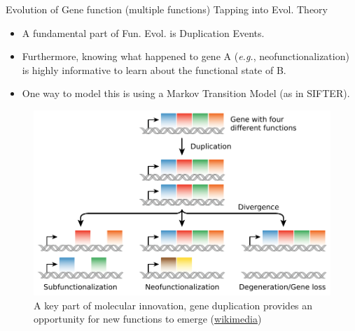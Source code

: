 \documentclass[10pt,aspectratio=169]{beamer}
\newcounter{frame}[frame]
\begin{document}
\begin{frame}{Evolution of Gene function (multiple functions)}
Tapping into Evol. Theory\\\bigskip

\begin{center}
\begin{minipage}{.44\linewidth}
\begin{itemize}[<+->]
    \item A fundamental part of Fun. Evol. is Duplication Events.
    \item Furthermore, knowing what happened to gene A (\textit{e.g.}, neofunctionalization) is highly informative to learn about the functional state of B.
    \item One way to model this is using a Markov Transition Model (as in SIFTER).
\end{itemize}
\end{minipage}
\begin{minipage}{.55\linewidth}
    \begin{figure}
    \centering
    \includegraphics[width=1\linewidth]{fig/Evolution_fate_duplicate_genes_-_vector.pdf}
    \caption{A key part of molecular innovation, gene duplication provides an opportunity for new functions to emerge (\href{https://en.wikipedia.org/wiki/File:Evolution_fate_duplicate_genes_-_vector.svg}{wikimedia})}
    \label{fig:duplication}
    \end{figure}
\end{minipage}
\end{center}

\end{frame}

	
\end{document}
